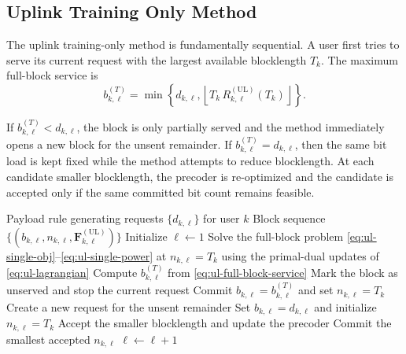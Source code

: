 \documentclass[11pt]{article}
\newcommand{\F}{\mathbf{F}}
\newcommand{\floor}[1]{\left\lfloor #1 \right\rfloor}
\newcommand{\UL}{\mathrm{UL}}
\begin{document}
\subsection{Uplink Training Only Method}

The uplink training-only method is fundamentally sequential. A user first tries
to serve its current request with the largest available blocklength $T_k$. The
maximum full-block service is
\begin{equation}
b_{k,\ell}^{(T)}
=
\min\!\left\{
d_{k,\ell},
\floor{T_k\,R_{k,\ell}^{(\UL)}(T_k)}
\right\}.
\label{eq:ul-full-block-service}
\end{equation}

If $b_{k,\ell}^{(T)} < d_{k,\ell}$, the block is only partially served and the
method immediately opens a new block for the unsent remainder. If
$b_{k,\ell}^{(T)} = d_{k,\ell}$, then the same bit load is kept fixed while the
method attempts to reduce blocklength. At each candidate smaller blocklength,
the precoder is re-optimized and the candidate is accepted only if the same
committed bit count remains feasible.

\begin{algorithm}[ht]
\caption{Training-Only Uplink Scheduler for One User}
\label{alg:ul-train-only}
\begin{algorithmic}[1]
\Require Payload rule generating requests $\{d_{k,\ell}\}$ for user $k$
\Ensure Block sequence $\{(b_{k,\ell},n_{k,\ell},\F_{k,\ell}^{(\UL)})\}$
\State Initialize $\ell \gets 1$
    \State Solve the full-block problem \eqref{eq:ul-single-obj}--\eqref{eq:ul-single-power} at $n_{k,\ell}=T_k$ using the primal-dual updates of \eqref{eq:ul-lagrangian}
    \State Compute $b_{k,\ell}^{(T)}$ from \eqref{eq:ul-full-block-service}
        \State Mark the block as unserved and stop the current request
    \EndIf
        \State Commit $b_{k,\ell}=b_{k,\ell}^{(T)}$ and set $n_{k,\ell}=T_k$
        \State Create a new request for the unsent remainder
    \Else
        \State Set $b_{k,\ell}=d_{k,\ell}$ and initialize $n_{k,\ell}=T_k$
            \State Accept the smaller blocklength and update the precoder
        \EndWhile
        \State Commit the smallest accepted $n_{k,\ell}$
    \EndIf
    \State $\ell \gets \ell + 1$
\EndWhile
\end{algorithmic}
\end{algorithm}
\end{document}
